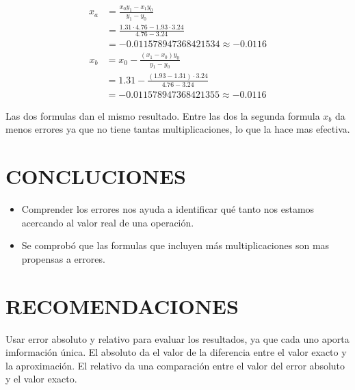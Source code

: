 \documentclass[12pt]{article}
\begin{document}
\begin{enumerate}
    \[
    \begin{aligned}
        x_a &= \frac{x_0y_1 - x_1y_0}{y_1-y_0} \\
          &= \frac{1.31 \cdot 4.76 - 1.93 \cdot 3.24}{4.76 - 3.24} \\
          &= -0.011578947368421534 \approx -0.0116
    \end{aligned}
    \]
    \[
    \begin{aligned}
        x_b &=  x_0 - \frac{(x_1-x_0)y_0}{y_1-y_0}\\
          &= 1.31 - \frac{(1.93 - 1.31) \cdot 3.24}{4.76 - 3.24} \\
          &= -0.011578947368421355 \approx -0.0116
    \end{aligned}
    \]

    Las dos formulas dan el mismo resultado. Entre las dos la segunda formula \(x_b\) da menos errores ya que no tiene tantas multiplicaciones, lo que la hace mas efectiva.
\end{enumerate}

\section*{CONCLUCIONES}
\begin{itemize}
    \item {Comprender los errores nos ayuda a identificar qué tanto nos estamos acercando al valor real de una operación.}
    \item {Se comprobó que las formulas que incluyen más multiplicaciones son mas propensas a errores.} 
\end{itemize}

\section*{RECOMENDACIONES}

Usar error absoluto y relativo para evaluar los resultados, ya que cada uno aporta
imformación única.
El absoluto da el valor de la diferencia entre el valor exacto y la aproximación.
El relativo da una comparación entre el valor del error absoluto y el valor exacto.
\renewcommand{\refname}{\MakeUppercase{REFERENCIAS}}


\end{document}
